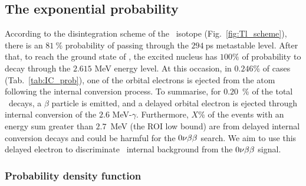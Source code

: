 \subsection{The exponential probability}

According to the disintegration scheme of the \Tl\ isotope (Fig.~\ref{fig:Tl_scheme}), there is an $81~\%$ probability of passing through the $294~$ps metastable level.
After that, to reach the ground state of \Pb, the excited nucleus has $100\%$ of probability to decay through the $2.615$ MeV energy level.
At this occasion, in $0.246\%$ of cases (Tab.~\ref{tab:IC_prob}), one of the orbital electrons is ejected from the atom following the internal conversion process.
To summarise, for $0.20$~\% of the total \Tl\ decays, a $\beta$ particle is emitted, and a delayed orbital electron is ejected through internal conversion of the $2.6$ MeV-$\gamma$.
Furthermore, $X$\% of the events with an energy sum greater than $2.7$~MeV (the ROI low bound) are from delayed internal conversion decays and could be harmful for the $0\nu\beta\beta$ search.
We aim to use this delayed electron to discriminate \Tl\ internal background from the $0\nu\beta\beta$ signal.


\subsubsection{Probability density function}

